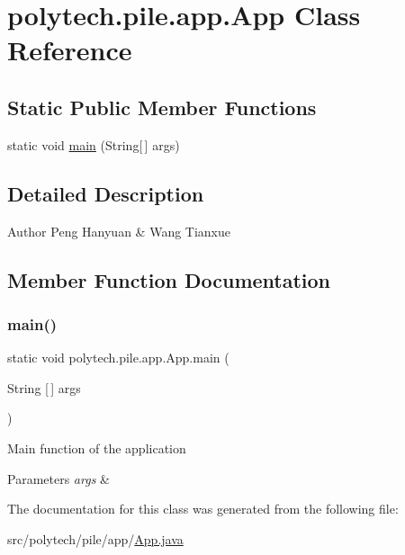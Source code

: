 \hypertarget{classpolytech_1_1pile_1_1app_1_1_app}{}\section{polytech.\+pile.\+app.\+App Class Reference}
\label{classpolytech_1_1pile_1_1app_1_1_app}
\subsection*{Static Public Member Functions}
\begin{DoxyCompactItemize}
\item 
static void \hyperlink{classpolytech_1_1pile_1_1app_1_1_app_aadd46e1f949d8a95c67bf3b0e327833a}{main} (String\mbox{[}$\,$\mbox{]} args)
\end{DoxyCompactItemize}


\subsection{Detailed Description}
\begin{DoxyAuthor}{Author}
Peng Hanyuan \& Wang Tianxue 
\end{DoxyAuthor}


\subsection{Member Function Documentation}
\hypertarget{classpolytech_1_1pile_1_1app_1_1_app_aadd46e1f949d8a95c67bf3b0e327833a}{}\label{classpolytech_1_1pile_1_1app_1_1_app_aadd46e1f949d8a95c67bf3b0e327833a} 
\subsubsection{\texorpdfstring{main()}{main()}}
{\footnotesize\ttfamily static void polytech.\+pile.\+app.\+App.\+main (\begin{DoxyParamCaption}\item[{String \mbox{[}$\,$\mbox{]}}]{args }\end{DoxyParamCaption})\hspace{0.3cm}{\ttfamily [static]}}

Main function of the application


\begin{DoxyParams}{Parameters}
{\em args} & \\
\hline
\end{DoxyParams}


The documentation for this class was generated from the following file\+:\begin{DoxyCompactItemize}
\item 
src/polytech/pile/app/\hyperlink{_app_8java}{App.\+java}\end{DoxyCompactItemize}
